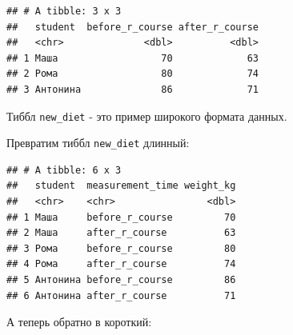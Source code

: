 \documentclass[
]{book}
\newenvironment{Shaded}{\begin{snugshade}}{\end{snugshade}}
\newcommand{\DataTypeTok}[1]{\textcolor[rgb]{0.13,0.29,0.53}{#1}}
\newcommand{\KeywordTok}[1]{\textcolor[rgb]{0.13,0.29,0.53}{\textbf{#1}}}
\newcommand{\NormalTok}[1]{#1}
\newcommand{\OperatorTok}[1]{\textcolor[rgb]{0.81,0.36,0.00}{\textbf{#1}}}
\newcommand{\StringTok}[1]{\textcolor[rgb]{0.31,0.60,0.02}{#1}}
\begin{document}
\begin{verbatim}
## # A tibble: 3 x 3
##   student  before_r_course after_r_course
##   <chr>              <dbl>          <dbl>
## 1 Маша                  70             63
## 2 Рома                  80             74
## 3 Антонина              86             71
\end{verbatim}

Тиббл \texttt{new\_diet} - это пример широкого формата данных.

Превратим тиббл \texttt{new\_diet} длинный:

\begin{Shaded}
\end{Shaded}

\begin{verbatim}
## # A tibble: 6 x 3
##   student  measurement_time weight_kg
##   <chr>    <chr>                <dbl>
## 1 Маша     before_r_course         70
## 2 Маша     after_r_course          63
## 3 Рома     before_r_course         80
## 4 Рома     after_r_course          74
## 5 Антонина before_r_course         86
## 6 Антонина after_r_course          71
\end{verbatim}

А теперь обратно в короткий:

\begin{Shaded}
\end{Shaded}
\end{document}
